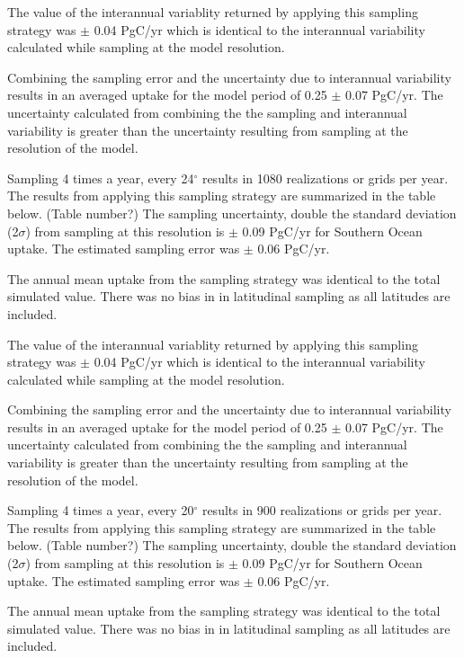 \documentclass[11pt, a4paper]{article}
\numberwithin{figure}{section}
\numberwithin{table}{section}
\begin{document}
The value of the interannual variablity returned by applying this
sampling strategy was $\pm$ 0.04 PgC/yr which is identical to the 
interannual variability calculated while sampling at the model 
resolution. 

Combining the sampling error and the uncertainty due to interannual
variability results in an averaged uptake for the model period of 
0.25 $\pm$ 0.07 PgC/yr.
The uncertainty calculated from combining the the sampling and 
interannual variability is greater than the uncertainty resulting from
sampling at the resolution of the model.


Sampling 4 times a year, every 24$^{\circ}$ results in 1080 realizations 
or grids per year. The results from applying this sampling strategy are
summarized in the table below. (Table number?)
The sampling uncertainty, double the standard deviation (2$\sigma$) 
from sampling at this resolution is
$\pm$ 0.09 PgC/yr for Southern Ocean uptake.
The estimated sampling error was 
$\pm$ 0.06 PgC/yr. %

The annual mean uptake from the sampling strategy was identical to 
the total simulated value. There was no bias in in latitudinal sampling
as all latitudes are included.

The value of the interannual variablity returned by applying this
sampling strategy was $\pm$ 0.04 PgC/yr which is identical to the 
interannual variability calculated while sampling at the model 
resolution. 

Combining the sampling error and the uncertainty due to interannual
variability results in an averaged uptake for the model period of 
0.25 $\pm$ 0.07 PgC/yr.
The uncertainty calculated from combining the the sampling and 
interannual variability is greater than the uncertainty resulting from
sampling at the resolution of the model.


Sampling 4 times a year, every 20$^{\circ}$ results in 900 realizations 
or grids per year. The results from applying this sampling strategy are
summarized in the table below. (Table number?)
The sampling uncertainty, double the standard deviation (2$\sigma$) 
from sampling at this resolution is
$\pm$ 0.09 PgC/yr for Southern Ocean uptake.
The estimated sampling error was 
$\pm$ 0.06 PgC/yr. %

The annual mean uptake from the sampling strategy was identical to 
the total simulated value. There was no bias in in latitudinal sampling
as all latitudes are included.
\end{document}

